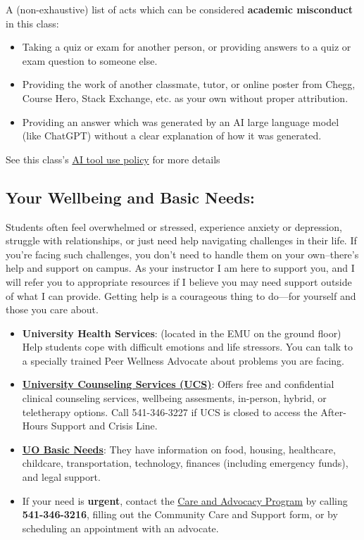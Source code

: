 A (non-exhaustive) list of acts which can be considered \textbf{academic misconduct} in this class:

\begin{itemize}
\item Taking a quiz or exam for another person, or providing answers to a quiz or exam question to someone else.
\item Providing the work of another classmate, tutor, or online poster from Chegg, Course Hero, Stack Exchange, etc. as your own without proper attribution.
\item Providing an answer which was generated by an AI large language model (like ChatGPT) without a clear explanation of how it was generated.
\end{itemize}

See this class's \hyperlink{policy:AI}{AI tool use policy} for more details

\subsection*{Your Wellbeing and Basic Needs:}

Students often feel overwhelmed or stressed, experience anxiety or depression, struggle with relationships, or just need help navigating challenges in their life.
If you're facing such challenges, you don't need to handle them on your own--there's help and support on campus. 
As your instructor I am here to support you, and I will refer you to appropriate resources if I believe you may need support outside of what I can provide.
Getting help is a courageous thing to do—for yourself and those you care about. 

\begin{itemize}

\item \textbf{University Health Services}: (located in the EMU on the ground floor) Help students cope with difficult emotions and life stressors. You can talk to a specially trained Peer Wellness Advocate about problems you are facing.

\item \href{https://counseling.uoregon.edu}{\textbf{University Counseling Services (UCS)}}: Offers free and confidential clinical counseling services, wellbeing assesments, in-person, hybrid, or teletherapy options.
Call 541-346-3227 if UCS is closed to access the After-Hours Support and Crisis Line.

\item \href{https://basicneeds.uoregon.edu/}{\textbf{UO Basic Needs}}:
They have information on food, housing, healthcare, childcare, transportation, technology, finances (including emergency funds), and legal support.

\item If your need is \textbf{\color{darkred} urgent}, contact the \href{https://dos.uoregon.edu/help}{Care and Advocacy Program} by calling \textbf{\color{darkred}541-346-3216}, filling out the Community Care and Support form, or by scheduling an appointment with an advocate.

\end{itemize}

